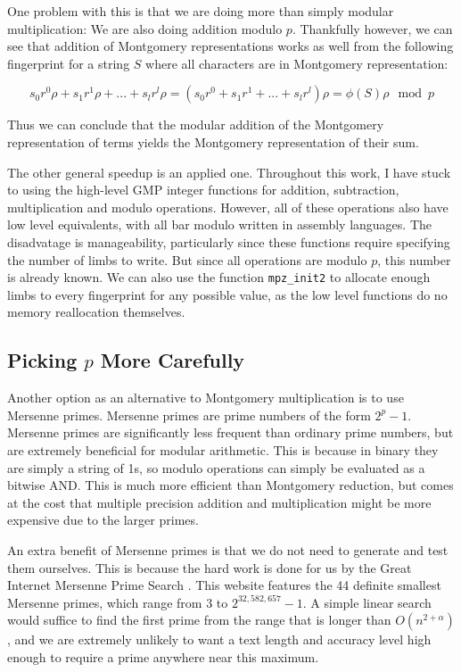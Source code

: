 \documentclass[ %
                    author={Dominic Joseph Moylett},
                    degree={MEng},
                     title={Dictionary Matching with Fingerprints},
                  subtitle={An Empirical Analysis},
                      type={research},
                      year={2015} ]{dissertation}
\begin{document}
One problem with this is that we are doing more than simply modular multiplication: We are also doing addition modulo $p$. Thankfully however, we can see that addition of Montgomery representations works as well from the following fingerprint for a string $S$ where all characters are in Montgomery representation:

$$s_0r^0\rho + s_1r^1\rho + ... + s_lr^l\rho = (s_0r^0 + s_1r^1 + ... + s_lr^l)\rho = \phi(S)\rho \mod p$$

Thus we can conclude that the modular addition of the Montgomery representation of terms yields the Montgomery representation of their sum.

The other general speedup is an applied one. Throughout this work, I have stuck to using the high-level GMP integer functions for addition, subtraction, multiplication and modulo operations. However, all of these operations also have low level equivalents, with all bar modulo written in assembly languages. The disadvatage is manageability, particularly since these functions require specifying the number of limbs to write. But since all operations are modulo $p$, this number is already known. We can also use the function \texttt{mpz\_init2} to allocate enough limbs to every fingerprint for any possible value, as the low level functions do no memory reallocation themselves.

\subsection{Picking $p$ More Carefully}
\label{ssec:pick-p}

Another option as an alternative to Montgomery multiplication is to use Mersenne primes. Mersenne primes are prime numbers of the form $2^p - 1$. Mersenne primes are significantly less frequent than ordinary prime numbers, but are extremely beneficial for modular arithmetic. This is because in binary they are simply a string of 1s, so modulo operations can simply be evaluated as a bitwise AND. This is much more efficient than Montgomery reduction, but comes at the cost that multiple precision addition and multiplication might be more expensive due to the larger primes.

An extra benefit of Mersenne primes is that we do not need to generate and test them ourselves. This is because the hard work is done for us by the Great Internet Mersenne Prime Search \cite{website:gimps-known}. This website features the 44 definite smallest Mersenne primes, which range from 3 to $2^{32,582,657}-1$. A simple linear search would suffice to find the first prime from the range that is longer than $O(n^{2 + \alpha})$, and we are extremely unlikely to want a text length and accuracy level high enough to require a prime anywhere near this maximum.
\end{document}

